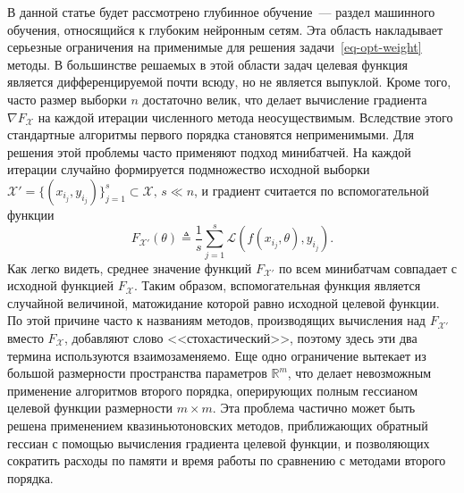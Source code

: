 \documentclass[preprint,12pt]{elsarticle}
\begin{document}
В данной статье будет рассмотрено глубинное обучение~--- раздел машинного обучения, относящийся к глубоким нейронным сетям.
Эта область накладывает серьезные ограничения на применимые для решения задачи~\eqref{eq-opt-weight} методы. 
В большинстве решаемых в этой области  задач целевая функция является дифференцируемой почти всюду, но не является выпуклой. 
Кроме того, часто размер выборки $n$ достаточно велик, что делает вычисление градиента $\nabla F_\mathcal{X}$ на каждой итерации численного метода неосуществимым. 
Вследствие этого стандартные алгоритмы первого порядка становятся неприменимыми. 
Для решения этой проблемы часто применяют подход минибатчей.
На каждой итерации случайно формируется подмножество исходной выборки $\mathcal{X}' = \{(x_{i_j}, y_{i_j})\}_{j=1}^s \subset \mathcal{X}, \, s \ll n$, и градиент считается по вспомогательной функции 
\begin{equation}
    F_{\mathcal{X}'}(\theta) \triangleq \frac1s \sum_{j=1}^s \mathcal{L}(f(x_{i_j}, \theta), y_{i_j}).
\end{equation} 
Как легко видеть, среднее значение функций $F_{\mathcal{X}'}$ по всем минибатчам совпадает с исходной функцией $F_\mathcal{X}$. 
Таким образом, вспомогательная функция является случайной величиной, матожидание которой равно исходной целевой функции. 
По этой причине часто к названиям методов, производящих вычисления над $F_{\mathcal{X}'}$ вместо $F_\mathcal{X}$, добавляют слово <<стохастический>>, поэтому здесь эти два термина используются взаимозаменяемо. 
Еще одно ограничение вытекает из большой размерности пространства параметров $\mathbb{R}^m$, что делает невозможным применение алгоритмов второго порядка, оперирующих полным гессианом целевой функции размерности $m \times m$. 
Эта проблема частично может быть решена применением квазиньютоновских методов, приближающих обратный гессиан с помощью вычисления градиента целевой функции, и позволяющих сократить расходы по памяти и время работы по сравнению с методами второго порядка.
\end{document}
